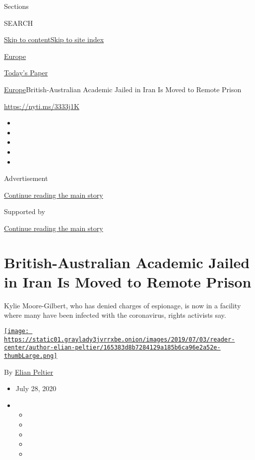 Sections

SEARCH

\protect\hyperlink{site-content}{Skip to
content}\protect\hyperlink{site-index}{Skip to site index}

\href{https://www.nytimes3xbfgragh.onion/section/world/europe}{Europe}

\href{https://myaccount.nytimes3xbfgragh.onion/auth/login?response_type=cookie\&client_id=vi}{}

\href{https://www.nytimes3xbfgragh.onion/section/todayspaper}{Today's
Paper}

\href{/section/world/europe}{Europe}\textbar{}British-Australian
Academic Jailed in Iran Is Moved to Remote Prison

\url{https://nyti.ms/3333j1K}

\begin{itemize}
\item
\item
\item
\item
\item
\end{itemize}

Advertisement

\protect\hyperlink{after-top}{Continue reading the main story}

Supported by

\protect\hyperlink{after-sponsor}{Continue reading the main story}

\hypertarget{british-australian-academic-jailed-in-iran-is-moved-to-remote-prison}{%
\section{British-Australian Academic Jailed in Iran Is Moved to Remote
Prison}\label{british-australian-academic-jailed-in-iran-is-moved-to-remote-prison}}

Kylie Moore-Gilbert, who has denied charges of espionage, is now in a
facility where many have been infected with the coronavirus, rights
activists say.

\href{https://www.nytimes3xbfgragh.onion/by/elian-peltier}{\texttt{[image: https://static01.graylady3jvrrxbe.onion/images/2019/07/03/reader-center/author-elian-peltier/165383d8b7284129a185b6ca96e2a52e-thumbLarge.png]}}

By \href{https://www.nytimes3xbfgragh.onion/by/elian-peltier}{Elian
Peltier}

\begin{itemize}
\item
  July 28, 2020
\item
  \begin{itemize}
  \item
  \item
  \item
  \item
  \item
  \end{itemize}
\end{itemize}

